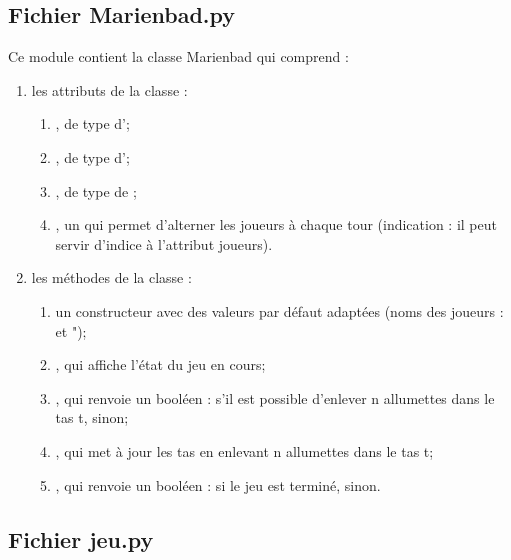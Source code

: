 \documentclass[a4paper,12pt,french]{book}
\begin{document}
\subsection*{Fichier Marienbad.py}
Ce module contient la classe Marienbad qui comprend :
\begin{enumerate}[--]
	\item 	les attributs de la classe :
			\begin{enumerate}[--]
				\item 	{}, de type  d’;
				\item {}, de type  d’;
				\item {}, de type  de ;
				\item {}, un  qui permet d’alterner les joueurs à chaque tour (indication : il peut servir d’indice à l’attribut joueurs).
			\end{enumerate}
	\item 	les méthodes de la classe :
		\begin{enumerate}[--]
			\item 	un constructeur avec des valeurs par défaut adaptées (noms des joueurs :  et ");
			\item 	{}, qui affiche l’état du jeu en cours;
			\item 	{}, qui renvoie un booléen :  s’il est possible d’enlever n allumettes dans le tas t,  sinon;
			\item 	{}, qui met à jour les tas en enlevant n allumettes dans le tas t;
			\item 	{}, qui renvoie un booléen :  si le jeu est terminé,  sinon.
		\end{enumerate}
\end{enumerate}

\subsection*{Fichier jeu.py}
\end{document}
